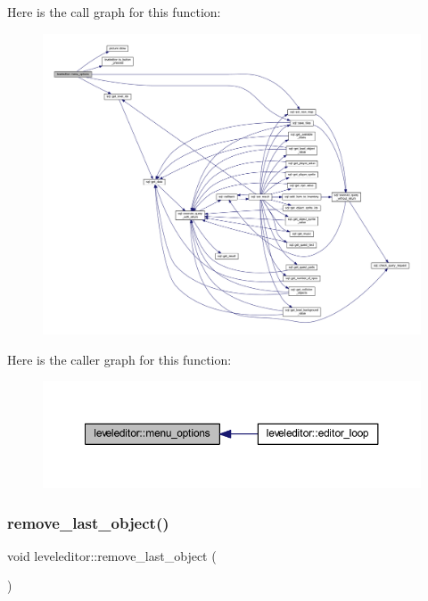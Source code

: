 Here is the call graph for this function\+:
\nopagebreak
\begin{figure}[H]
\begin{center}
\leavevmode
\includegraphics[width=350pt]{classleveleditor_aa44f48b9869b3d5e0ce0429c6916e2b9_cgraph}
\end{center}
\end{figure}
Here is the caller graph for this function\+:
\nopagebreak
\begin{figure}[H]
\begin{center}
\leavevmode
\includegraphics[width=350pt]{classleveleditor_aa44f48b9869b3d5e0ce0429c6916e2b9_icgraph}
\end{center}
\end{figure}
\mbox{\label{classleveleditor_aa2b54b93aa87f704d841f6ccd59b4e38}} 
\subsubsection{\texorpdfstring{remove\+\_\+last\+\_\+object()}{remove\_last\_object()}}
{\footnotesize\ttfamily void leveleditor\+::remove\+\_\+last\+\_\+object (\begin{DoxyParamCaption}{ }\end{DoxyParamCaption})\hspace{0.3cm}{\ttfamily [private]}}



